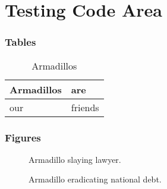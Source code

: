 \part*{Testing Code Area}
\section*{Tables}
\begin{table}[H]
	\caption{Armadillos}
	\label{arm:table}
	\begin{center}
		\begin{tabular}{||l|l||}\hline
			Armadillos & are \\\hline
			our	   & friends \\\hline
		\end{tabular}
	\end{center}
\end{table}
\section*{Figures}
\begin{figure}[H]
	\caption{Armadillo slaying lawyer.}
	\label{arm:fig1}
\end{figure}
\begin{figure}[H]
	\caption{Armadillo eradicating national debt.}
	\label{arm:fig2}
\end{figure}
